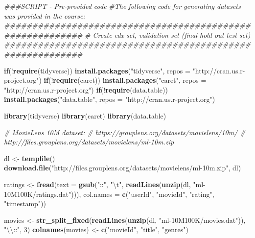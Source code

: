 \documentclass[
]{article}
\newenvironment{Shaded}{}{}
\newcommand{\CharTok}[1]{\textcolor[rgb]{0.25,0.44,0.63}{#1}}
\newcommand{\CommentTok}[1]{\textcolor[rgb]{0.38,0.63,0.69}{\textit{#1}}}
\newcommand{\ControlFlowTok}[1]{\textcolor[rgb]{0.00,0.44,0.13}{\textbf{#1}}}
\newcommand{\DataTypeTok}[1]{\textcolor[rgb]{0.56,0.13,0.00}{#1}}
\newcommand{\DecValTok}[1]{\textcolor[rgb]{0.25,0.63,0.44}{#1}}
\newcommand{\KeywordTok}[1]{\textcolor[rgb]{0.00,0.44,0.13}{\textbf{#1}}}
\newcommand{\NormalTok}[1]{#1}
\newcommand{\OperatorTok}[1]{\textcolor[rgb]{0.40,0.40,0.40}{#1}}
\newcommand{\StringTok}[1]{\textcolor[rgb]{0.25,0.44,0.63}{#1}}
\begin{document}
\begin{Shaded}
\begin{Highlighting}[]
\CommentTok{###SCRIPT - Pre-provided code}
\CommentTok{#The following code for generating datasets was provided in the course:}
\CommentTok{##########################################################}
\CommentTok{# Create edx set, validation set (final hold-out test set)}
\CommentTok{##########################################################}

\ControlFlowTok{if}\NormalTok{(}\OperatorTok{!}\KeywordTok{require}\NormalTok{(tidyverse)) }\KeywordTok{install.packages}\NormalTok{(}\StringTok{"tidyverse"}\NormalTok{, }\DataTypeTok{repos =} \StringTok{"http://cran.us.r-project.org"}\NormalTok{)}
\ControlFlowTok{if}\NormalTok{(}\OperatorTok{!}\KeywordTok{require}\NormalTok{(caret)) }\KeywordTok{install.packages}\NormalTok{(}\StringTok{"caret"}\NormalTok{, }\DataTypeTok{repos =} \StringTok{"http://cran.us.r-project.org"}\NormalTok{)}
\ControlFlowTok{if}\NormalTok{(}\OperatorTok{!}\KeywordTok{require}\NormalTok{(data.table)) }\KeywordTok{install.packages}\NormalTok{(}\StringTok{"data.table"}\NormalTok{, }\DataTypeTok{repos =} \StringTok{"http://cran.us.r-project.org"}\NormalTok{)}

\KeywordTok{library}\NormalTok{(tidyverse)}
\KeywordTok{library}\NormalTok{(caret)}
\KeywordTok{library}\NormalTok{(data.table)}

\CommentTok{# MovieLens 10M dataset:}
\CommentTok{# https://grouplens.org/datasets/movielens/10m/}
\CommentTok{# http://files.grouplens.org/datasets/movielens/ml-10m.zip}

\NormalTok{dl <-}\StringTok{ }\KeywordTok{tempfile}\NormalTok{()}
\KeywordTok{download.file}\NormalTok{(}\StringTok{"http://files.grouplens.org/datasets/movielens/ml-10m.zip"}\NormalTok{, dl)}

\NormalTok{ratings <-}\StringTok{ }\KeywordTok{fread}\NormalTok{(}\DataTypeTok{text =} \KeywordTok{gsub}\NormalTok{(}\StringTok{"::"}\NormalTok{, }\StringTok{"}\CharTok{\textbackslash{}t}\StringTok{"}\NormalTok{, }\KeywordTok{readLines}\NormalTok{(}\KeywordTok{unzip}\NormalTok{(dl, }\StringTok{"ml-10M100K/ratings.dat"}\NormalTok{))),}
                 \DataTypeTok{col.names =} \KeywordTok{c}\NormalTok{(}\StringTok{"userId"}\NormalTok{, }\StringTok{"movieId"}\NormalTok{, }\StringTok{"rating"}\NormalTok{, }\StringTok{"timestamp"}\NormalTok{))}

\NormalTok{movies <-}\StringTok{ }\KeywordTok{str_split_fixed}\NormalTok{(}\KeywordTok{readLines}\NormalTok{(}\KeywordTok{unzip}\NormalTok{(dl, }\StringTok{"ml-10M100K/movies.dat"}\NormalTok{)), }\StringTok{"}\CharTok{\textbackslash{}\textbackslash{}}\StringTok{::"}\NormalTok{, }\DecValTok{3}\NormalTok{)}
\KeywordTok{colnames}\NormalTok{(movies) <-}\StringTok{ }\KeywordTok{c}\NormalTok{(}\StringTok{"movieId"}\NormalTok{, }\StringTok{"title"}\NormalTok{, }\StringTok{"genres"}\NormalTok{)}


\end{Highlighting}
\end{Shaded}
\end{document}
